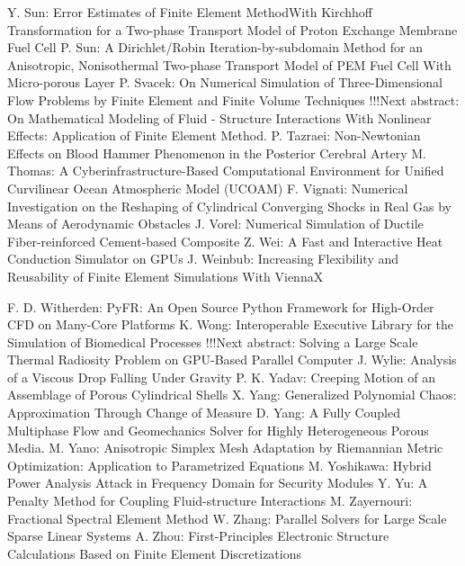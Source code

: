 \documentclass[10pt, A4]{article}%
\begin{document}
{Y. Sun}: {Error Estimates of Finite Element MethodWith Kirchhoff Transformation for a Two-phase Transport Model of Proton Exchange Membrane Fuel Cell}
{P. Sun}: {A Dirichlet/Robin Iteration-by-subdomain Method for an Anisotropic, Nonisothermal Two-phase Transport Model of PEM Fuel Cell With Micro-porous Layer}
{P. Svacek}: {On Numerical Simulation of Three-Dimensional Flow Problems by Finite Element and Finite Volume Techniques       !!!Next abstract: On Mathematical Modeling of Fluid - Structure Interactions With Nonlinear Effects: Application of Finite Element Method.}
{P. Tazraei}: {Non-Newtonian Effects on Blood Hammer Phenomenon in the Posterior Cerebral Artery}
{M. Thomas}: {A Cyberinfrastructure-Based Computational Environment for Unified Curvilinear Ocean Atmospheric Model  (UCOAM)}
{F. Vignati}: {Numerical Investigation on the Reshaping of Cylindrical Converging Shocks in Real Gas by Means of Aerodynamic Obstacles}
{J. Vorel}: {Numerical Simulation of Ductile Fiber-reinforced Cement-based Composite}
{Z. Wei}: {A Fast and Interactive Heat Conduction Simulator on GPUs}
{J. Weinbub}: {Increasing Flexibility and Reusability of Finite Element Simulations With ViennaX}

{F. D. Witherden}: {PyFR: An Open Source Python Framework for High-Order CFD on Many-Core Platforms}
{K. Wong}: {Interoperable Executive Library for the Simulation of Biomedical Processes       !!!Next abstract: Solving a Large Scale Thermal Radiosity Problem on GPU-Based Parallel Computer}
{J. Wylie}: {Analysis of a Viscous Drop Falling Under Gravity}
{P. K. Yadav}: {Creeping Motion of an Assemblage of Porous Cylindrical Shells}
{X. Yang}: {Generalized Polynomial Chaos: Approximation Through Change of Measure}
{D. Yang}: {A Fully Coupled Multiphase Flow and Geomechanics Solver for Highly Heterogeneous Porous Media.}
{M. Yano}: {Anisotropic Simplex Mesh Adaptation by Riemannian Metric Optimization: Application to Parametrized Equations}
{M. Yoshikawa}: {Hybrid Power Analysis Attack in Frequency Domain for Security Modules}
{Y. Yu}: {A Penalty Method for Coupling Fluid-structure Interactions}
{M. Zayernouri}: {Fractional Spectral Element Method}
{W. Zhang}: {Parallel Solvers for Large Scale Sparse Linear Systems}
{A. Zhou}: {First-Principles Electronic Structure Calculations Based on Finite Element Discretizations}
\end{document}
